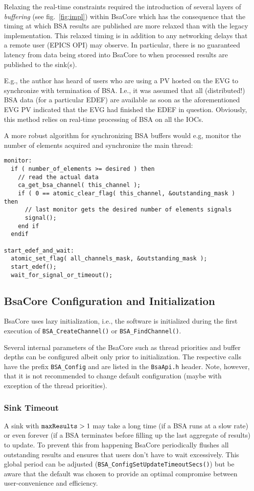 \documentclass[11pt]{article}
\newcommand{\bsac}{BsaCore}
\newcommand{\bsa} {BSA}
\newcommand{\EDEF}{EDEF}
\newcommand{\cod}[1]{{\tt#1}}
\begin{document}
Relaxing the real-time constraints required the introduction of several
layers of {\em buffering} (see fig.~\ref{fig:impl}) within \bsac{} which
has the consequence that the timing at which \bsa{} results are published
are more relaxed than with the legacy implementation.
This relaxed timing is in addition to any
networking delays that a remote user (EPICS OPI) may observe. In particular,
there is no guaranteed latency from data being stored into \bsac{} to when
processed results are published to the sink(s).

E.g., the author has heard of users who are using a PV hosted on the EVG
to synchronize with termination of \bsa{}. I.e., it was assumed that
all (distributed!) \bsa{} data (for a particular \EDEF{}) are available
as soon as the aforementioned EVG PV indicated that the EVG had finished the
\EDEF{} in question. Obviously, this method relies on real-time 
processing of \bsa{} on all the IOCs.

A more robust algorithm for synchronizing \bsa{} buffers would
e.g, monitor the number of elements acquired and synchronize
the main thread:
\begin{lstlisting}
monitor:
  if ( number_of_elements >= desired ) then
    // read the actual data
    ca_get_bsa_channel( this_channel );
    if ( 0 == atomic_clear_flag( this_channel, &outstanding_mask ) then
      // last monitor gets the desired number of elements signals
      signal();
    end if
  endif

start_edef_and_wait:
  atomic_set_flag( all_channels_mask, &outstanding_mask );
  start_edef();
  wait_for_signal_or_timeout();
\end{lstlisting}

\subsection{\bsac{} Configuration and Initialization}
\bsac{} uses lazy initialization, i.e., the software is initialized
during the first execution of
\cod{BSA\_CreateChannel()} or \cod{BSA\_FindChannel()}.

Several internal parameters of the \bsac{} such as thread priorities
and buffer depths can be configured albeit only prior to initialization.
The respective calls have the prefix \cod{BSA\_Config} and are listed
in the \cod{BsaApi.h} header. Note, however, that it is not recommended
to change default configuration (maybe with exception of the thread
priorities).

\subsubsection{Sink Timeout}
A sink with $\cod{maxResults} >1$ may take a long time (if a \bsa{} runs
at a slow rate) or even forever (if a \bsa{} terminates before filling up
the last aggregate of results) to update. To prevent this from happening
\bsac{} periodically flushes all outstanding results and ensures that
users don't have to wait excessively. This global period can be adjusted
(\cod{BSA\_ConfigSetUpdateTimeoutSecs()}) but be aware that the default was
chosen to provide an optimal compromise between user-convenience and efficiency.
\appendix
\pagebreak
\end{document}
